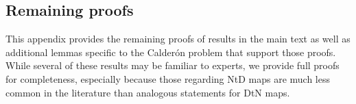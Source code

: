 \documentclass[pdflatex,sn-mathphys-num]{sn-jnl-preprint}
\newcommand{\mysecspace}{\hskip.5em}
\theoremstyle{thmstyleone}%
\theoremstyle{thmstyletwo}%
\theoremstyle{thmstylethree}%
\numberwithin{equation}{section}
\numberwithin{theorem}{section}
\begin{document}
\begin{appendices}

\makeatletter
\def\@seccntformat#1{\@ifundefined{#1@cntformat}%
	{\csname the#1\endcsname\mysecspace}%
	{\csname #1@cntformat\endcsname}}%
\newcommand\section@cntformat{\appendixname\ \thesection.\mysecspace}       %
\newcommand\subsection@cntformat{\thesubsection.\mysecspace} 				%
\newcommand\subsubsection@cntformat{\thesubsubsection.\mysecspace} 				%
\makeatother


\section{Remaining proofs}\label{app:proofs}
This appendix provides the remaining proofs of results in the main text as well as additional lemmas specific to the Calder\'on problem that support those proofs. While several of these results may be familiar to experts, we provide full proofs for completeness, especially because those regarding NtD maps are much less common in the literature than analogous statements for DtN maps.


\end{appendices}
\end{document}
